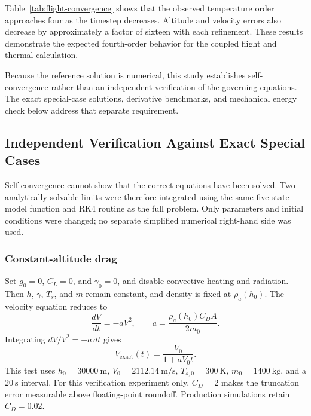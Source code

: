 \documentclass[conf]{new-aiaa}
\begin{document}
Table~\ref{tab:flight-convergence} shows that the observed
temperature order approaches four as the timestep decreases.
Altitude and velocity errors also decrease by approximately
a factor of sixteen with each refinement.
These results demonstrate the expected fourth-order behavior
for the coupled flight and thermal calculation.

Because the reference solution is numerical, this study establishes
self-convergence rather than an independent verification of the
governing equations. The exact special-case solutions, derivative benchmarks, and mechanical energy check below
address that separate requirement.

\subsection{Independent Verification Against Exact Special Cases}

Self-convergence cannot show that the correct equations have been solved.
Two analytically solvable limits were therefore integrated using the same
five-state model function and RK4 routine as the full problem. Only parameters
and initial conditions were changed; no separate simplified numerical
right-hand side was used.

\subsubsection{Constant-altitude drag}

Set $g_0=0$, $C_L=0$, and $\gamma_0=0$, and disable convective heating and
radiation. Then $h$, $\gamma$, $T_s$, and $m$ remain constant, and density is
fixed at $\rho_a(h_0)$. The velocity equation reduces to
\begin{equation}
\frac{dV}{dt}=-aV^2,
\qquad a=\frac{\rho_a(h_0)C_D A}{2m_0}.
\end{equation}
Integrating $dV/V^2=-a\,dt$ gives
\begin{equation}
V_{\mathrm{exact}}(t)=\frac{V_0}{1+aV_0t}.
\end{equation}
This test uses $h_0=30000~\mathrm{m}$, $V_0=2112.14~\mathrm{m/s}$,
$T_{s,0}=300~\mathrm{K}$, $m_0=1400~\mathrm{kg}$, and a $20~\mathrm{s}$
interval. For this verification experiment only, $C_D=2$ makes the
truncation error measurable above floating-point roundoff. Production
simulations retain $C_D=0.02$.
\end{document}
